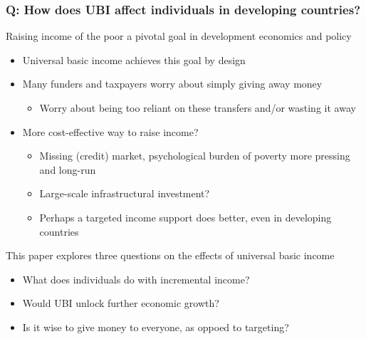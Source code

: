 \documentclass[aspectratio=169]{beamer}
\begin{document}
\begin{frame}
\frametitle{Q: How does UBI affect individuals in developing countries?}
Raising income of the poor a pivotal goal in development economics and policy
\begin{itemize}\setlength\itemsep{3pt}
\item Universal basic income achieves this goal by design
\item Many funders and taxpayers worry about simply giving away money
\begin{itemize}\setlength\itemsep{3pt}
\item Worry about being too reliant on these transfers and/or wasting it away
\end{itemize}
\item More cost-effective way to raise income?
\begin{itemize}\setlength\itemsep{3pt}
\item Missing (credit) market, psychological burden of poverty more pressing and long-run
\item Large-scale infrastructural investment?
\item Perhaps a targeted income support does better, even in developing countries
\end{itemize}
\end{itemize}\medskip
This paper explores three questions on the effects of universal basic income
\begin{itemize}\setlength\itemsep{3pt}
\item What does individuals do with incremental income?
\item Would UBI unlock further economic growth?
\item Is it wise to give money to everyone, as oppoed to targeting?
\end{itemize}
\end{frame}
\end{document}
